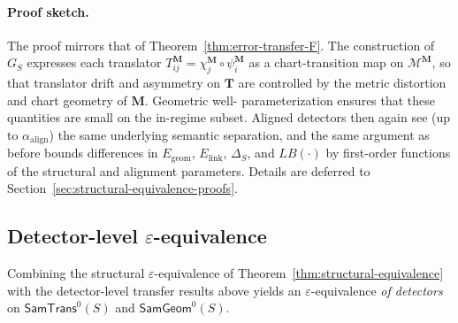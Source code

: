 \documentclass[11pt]{article}
\newcommand{\SamTrans}{\mathsf{SamTrans}}
\newcommand{\SamGeom}{\mathsf{SamGeom}}
\begin{document}
\paragraph{Proof sketch.}
The proof mirrors that of Theorem~\ref{thm:error-transfer-F}.  The
construction of $G_S$ expresses each translator
$T_{ij}^{\mathbf{M}} = \chi^{\mathbf{M}}_j \circ \psi^{\mathbf{M}}_i$ as a
chart-transition map on $\mathcal{M}^{\mathbf{M}}$, so that translator
drift and asymmetry on $\mathbf{T}$ are controlled by the metric
distortion and chart geometry of $\mathbf{M}$.  Geometric well-
parameterization ensures that these quantities are small on the in-regime
subset.  Aligned detectors then again see (up to $\alpha_{\mathrm{align}}$)
the same underlying semantic separation, and the same argument as before
bounds differences in $E_{\mathrm{geom}}$, $E_{\mathrm{link}}$,
$\Delta_S$, and $LB(\cdot)$ by first-order functions of the structural
and alignment parameters.  Details are deferred to
Section~\ref{sec:structural-equivalence-proofs}.

\subsection{Detector-level \texorpdfstring{$\varepsilon$}{ε}-equivalence}
\label{subsec:detector-eps-equiv}

Combining the structural $\varepsilon$-equivalence of
Theorem~\ref{thm:structural-equivalence} with the detector-level transfer
results above yields an $\varepsilon$-equivalence \emph{of detectors} on
$\SamTrans^0(S)$ and $\SamGeom^0(S)$.
\end{document}
